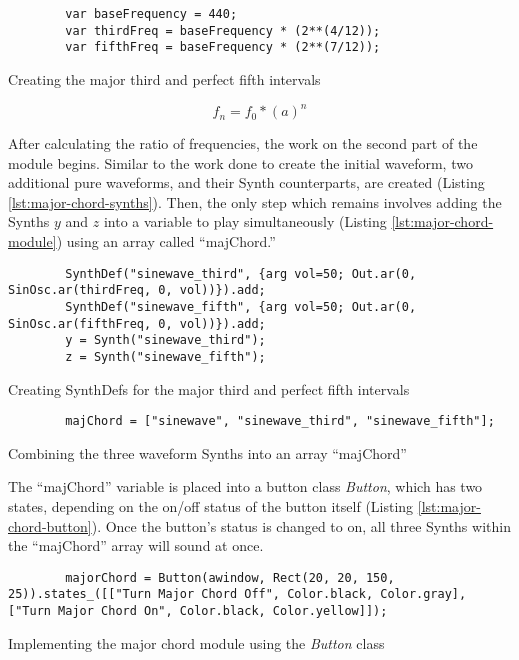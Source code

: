 \begin{listing}
	\begin{lstlisting}
		var baseFrequency = 440;
		var thirdFreq = baseFrequency * (2**(4/12));
		var fifthFreq = baseFrequency * (2**(7/12));
	\end{lstlisting}
	\label{lst:chord-creation}
	\caption{Creating the major third and perfect fifth intervals}
\end{listing}

\begin{equation}
	f_n = f_0 * (a)^n
	\label{eq:equal-temperament-eq}
\end{equation}

After calculating the ratio of frequencies, the work on the second part of the module begins. Similar to the work done to create the initial waveform, two additional pure waveforms, and their Synth counterparts, are created (Listing \ref{lst:major-chord-synths}). Then, the only step which remains involves adding the Synths $y$ and $z$ into a variable to play simultaneously (Listing \ref{lst:major-chord-module}) using an array called ``majChord.''

\begin{listing}
	\begin{lstlisting}
		SynthDef("sinewave_third", {arg vol=50; Out.ar(0, SinOsc.ar(thirdFreq, 0, vol))}).add;
		SynthDef("sinewave_fifth", {arg vol=50; Out.ar(0, SinOsc.ar(fifthFreq, 0, vol))}).add;
		y = Synth("sinewave_third");
		z = Synth("sinewave_fifth");
	\end{lstlisting}
	\label{lst:major-chord-synths}
	\caption{Creating SynthDefs for the major third and perfect fifth intervals}	
\end{listing}

\begin{listing}
	\begin{lstlisting}
		majChord = ["sinewave", "sinewave_third", "sinewave_fifth"];
	\end{lstlisting}
	\label{lst:major-chord-module}
	\caption{Combining the three waveform Synths into an array ``majChord''}
\end{listing}

The ``majChord'' variable is placed into a button class \textit{Button}, which has two states, depending on the on/off status of the button itself (Listing \ref{lst:major-chord-button}). Once the button's status is changed to on, all three Synths within the ``majChord'' array will sound at once.

\begin{listing}
	\begin{lstlisting}
		majorChord = Button(awindow, Rect(20, 20, 150, 25)).states_([["Turn Major Chord Off", Color.black, Color.gray], ["Turn Major Chord On", Color.black, Color.yellow]]);	
	\end{lstlisting}
	\label{lst:major-chord-button}
	\caption{Implementing the major chord module using the \textit{Button} class}
\end{listing}

